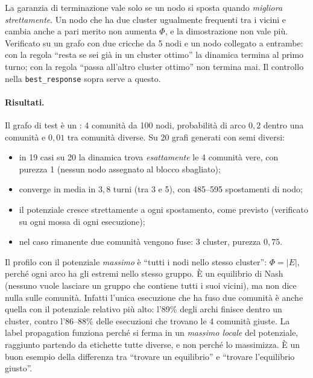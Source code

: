 \begin{attenzione}
La garanzia di terminazione vale solo se un nodo si sposta quando \emph{migliora
strettamente}. Un nodo che ha due cluster ugualmente frequenti tra i vicini e cambia anche a
pari merito non aumenta $\Phi$, e la dimostrazione non vale più. Verificato su un grafo con
due cricche da 5 nodi e un nodo collegato a entrambe: con la regola ``resta se sei già in un
cluster ottimo'' la dinamica termina al primo turno; con la regola ``passa all'altro
cluster ottimo'' non termina mai. Il controllo nella \texttt{best\_response} sopra serve a
questo.
\end{attenzione}

\paragraph{Risultati.}
Il grafo di test è un : 4 comunità da 100 nodi, probabilità
di arco $0{,}2$ dentro una comunità e $0{,}01$ tra comunità diverse. Su 20 grafi generati con
semi diversi:
\begin{itemize}
  \item in 19 casi su 20 la dinamica trova \emph{esattamente} le 4 comunità vere, con
        purezza 1 (nessun nodo assegnato al blocco sbagliato);
  \item converge in media in $3{,}8$ turni (tra 3 e 5), con 485--595 spostamenti di nodo;
  \item il potenziale cresce strettamente a ogni spostamento, come previsto (verificato
        su ogni mossa di ogni esecuzione);
  \item nel caso rimanente due comunità vengono fuse: 3 cluster, purezza $0{,}75$.
\end{itemize}

\begin{osservazione}
Il profilo con il potenziale \emph{massimo} è ``tutti i nodi nello stesso cluster'':
$\Phi = |E|$, perché ogni arco ha gli estremi nello stesso gruppo. È un equilibrio di Nash
(nessuno vuole lasciare un gruppo che contiene tutti i suoi vicini), ma non dice nulla sulle
comunità. Infatti l'unica esecuzione che ha fuso due comunità è anche quella con il
potenziale relativo più alto: l'89\% degli archi finisce dentro un cluster, contro l'86--88\%
delle esecuzioni che trovano le 4 comunità giuste. La label propagation funziona perché si
ferma in un \emph{massimo locale}
del potenziale, raggiunto partendo da etichette tutte diverse, e non perché lo massimizza.
È un buon esempio della differenza tra ``trovare un equilibrio'' e ``trovare l'equilibrio
giusto''.
\end{osservazione}


